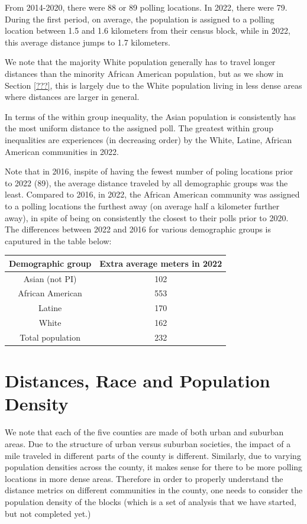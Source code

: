 \documentclass[11pt]{article}
\theoremstyle{remark}
\theoremstyle{definition}
\begin{document}
From 2014-2020, there were 88 or 89 polling locations. In 2022, there were 79. During the first period, on average, the population is assigned to a polling location between 1.5 and 1.6 kilometers from their census block, while in 2022, this average distance jumps to 1.7 kilometers. 

We note that the majority White population generally has to travel longer distances than the minority African American population, but as we show in Section \ref{???}, this is largely due to the White population living in less dense areas where distances are larger in general. 

In terms of the within group inequality, the Asian population is consistently has the most uniform distance to the assigned poll. The greatest within group inequalities are experiences (in decreasing order) by the White, Latine, African American communities in 2022.

Note that in 2016, inspite of having the fewest number of poling locations prior to 2022 (89), the average distance traveled by all demographic groups was the least. Compared to 2016, in 2022, the African American community was assigned to a polling locations the furthest away (on average half a kilometer further away), in spite of being on consistently the closest to their polls prior to 2020. The differences between 2022 and 2016 for various demographic groups is caputured in the table below:

\begin{tabular}{|c|c|}
	\hline
	Demographic group & Extra average meters in 2022 \\ \hline
	Asian (not PI) &   102 \\ \hline
	African American &   553  \\ \hline
	Latine & 170 \\ \hline
	White &  162\\ \hline
	Total population &  232\\ \hline
\end{tabular}

\section{Distances, Race and Population Density}
We note that each of the five counties are made of both urban and suburban areas. Due to the structure of urban versus suburban societies, the impact of a mile traveled in different parts of the county is different. Similarly, due to varying population densities across the county, it makes sense for there to be more polling locations in more dense areas. Therefore in order to properly understand the distance metrics on different communities in the county, one needs to consider the population density of the blocks (which is a set of analysis that we have started, but not completed yet.)
\end{document}

